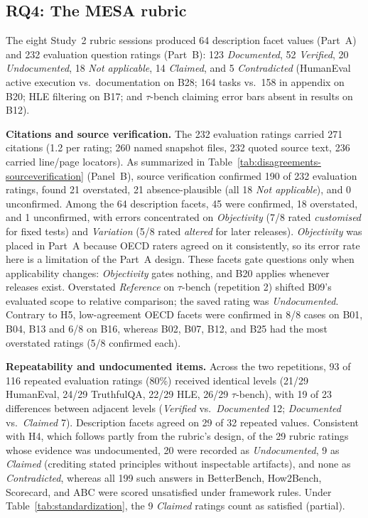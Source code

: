 \documentclass[10pt,conference]{IEEEtran}
\begin{document}
\subsection{RQ4: The MESA rubric}
\label{sec:rq4}
The eight Study~2 rubric sessions produced 64 description facet values (Part~A) and 232 evaluation question ratings (Part~B): 123 \emph{Documented}, 52 \emph{Verified}, 20 \emph{Undocumented}, 18 \emph{Not applicable}, 14 \emph{Claimed}, and 5 \emph{Contradicted} (HumanEval active execution vs.\ documentation on B28; 164 tasks vs.\ 158 in appendix on B20; HLE filtering on B17; and $\tau$-bench claiming error bars absent in results on B12).

\textbf{Citations and source verification.} The 232 evaluation ratings carried 271 citations (1.2 per rating; 260 named snapshot files, 232 quoted source text, 236 carried line/page locators). As summarized in Table~\ref{tab:disagreements-sourceverification} (Panel~B), source verification confirmed 190 of 232 evaluation ratings, found 21 overstated, 21 absence-plausible (all 18 \emph{Not applicable}), and 0 unconfirmed. Among the 64 description facets, 45 were confirmed, 18 overstated, and 1 unconfirmed, with errors concentrated on \emph{Objectivity} (7/8 rated \emph{customised} for fixed tests) and \emph{Variation} (5/8 rated \emph{altered} for later releases). \emph{Objectivity} was placed in Part~A because OECD raters agreed on it consistently, so its error rate here is a limitation of the Part~A design. These facets gate questions only when applicability changes: \emph{Objectivity} gates nothing, and B20 applies whenever releases exist. Overstated \emph{Reference} on $\tau$-bench (repetition 2) shifted B09's evaluated scope to relative comparison; the saved rating was \emph{Undocumented}. Contrary to H5, low-agreement OECD facets were confirmed in 8/8 cases on B01, B04, B13 and 6/8 on B16, whereas B02, B07, B12, and B25 had the most overstated ratings (5/8 confirmed each).

\textbf{Repeatability and undocumented items.} Across the two repetitions, 93 of 116 repeated evaluation ratings (80\%) received identical levels (21/29 HumanEval, 24/29 TruthfulQA, 22/29 HLE, 26/29 $\tau$-bench), with 19 of 23 differences between adjacent levels (\emph{Verified} vs.\ \emph{Documented} 12; \emph{Documented} vs.\ \emph{Claimed} 7). Description facets agreed on 29 of 32 repeated values. Consistent with H4, which follows partly from the rubric's design, of the 29 rubric ratings whose evidence was undocumented, 20 were recorded as \emph{Undocumented}, 9 as \emph{Claimed} (crediting stated principles without inspectable artifacts), and none as \emph{Contradicted}, whereas all 199 such answers in BetterBench, How2Bench, Scorecard, and ABC were scored unsatisfied under framework rules. Under Table~\ref{tab:standardization}, the 9 \emph{Claimed} ratings count as satisfied (partial).
\end{document}
